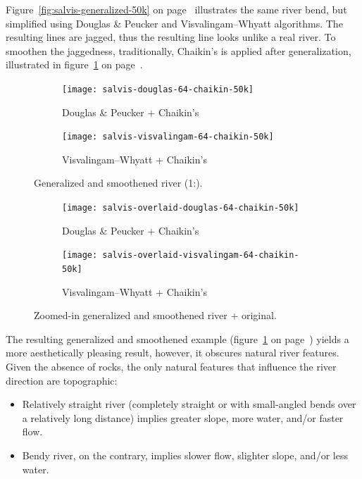 \documentclass[a4paper]{article}
\newcommand{\onpage}[1]{\ref{#1} on page~\pageref{#1}}
\newcommand{\DP}{Douglas \& Peucker}
\newcommand{\VW}{Visvalingam--Whyatt}
\begin{document}
Figure~\onpage{fig:salvis-generalized-50k} illustrates the same river bend, but
simplified using {\DP} and {\VW} algorithms. The resulting lines are jagged,
thus the resulting line looks unlike a real river. To smoothen the jaggedness,
traditionally, Chaikin's\cite{chaikin1974algorithm} is applied after
generalization, illustrated in
figure~\onpage{fig:salvis-generalized-chaikin-50k}.

\begin{figure}[h]
    \centering
    \begin{subfigure}[b]{.49\textwidth}
        \texttt{[image: salvis-douglas-64-chaikin-50k]}
        \caption{{\DP} + Chaikin's}
    \end{subfigure}
    \hfill
    \begin{subfigure}[b]{.49\textwidth}
        \texttt{[image: salvis-visvalingam-64-chaikin-50k]}
        \caption{{\VW} + Chaikin's}
    \end{subfigure}
    \caption{Generalized and smoothened river (1:).}
    \label{fig:salvis-generalized-chaikin-50k}
\end{figure}

\begin{figure}[h]
    \centering
    \begin{subfigure}[b]{.49\textwidth}
        \texttt{[image: salvis-overlaid-douglas-64-chaikin-50k]}
        \caption{{\DP} + Chaikin's}
    \end{subfigure}
    \hfill
    \begin{subfigure}[b]{.49\textwidth}
        \texttt{[image: salvis-overlaid-visvalingam-64-chaikin-50k]}
        \caption{{\VW} + Chaikin's}
    \end{subfigure}
    \caption{Zoomed-in generalized and smoothened river + original.}
    \label{fig:salvis-overlaid-generalized-chaikin-50k}
\end{figure}

The resulting generalized and smoothened example
(figure~\onpage{fig:salvis-generalized-chaikin-50k}) yields a more
aesthetically pleasing result, however, it obscures natural river features.
Given the absence of rocks, the only natural features that influence the river
direction are topographic:

\begin{itemize}

    \item Relatively straight river (completely straight or with small-angled
        bends over a relatively long distance) implies greater slope, more
        water, and/or faster flow.

    \item Bendy river, on the contrary, implies slower flow, slighter slope,
        and/or less water.

\end{itemize}
\end{document}
